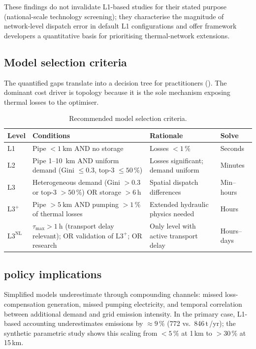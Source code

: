 \documentclass[a4paper,fleqn]{cas-dc}
\newcommand{\Lplus}{\mathrm{L3}^{+}}
\newcommand{\Lnl}{\mathrm{L3}^{\mathrm{NL}}}
\begin{document}
These findings do not invalidate L1-based studies for their
stated purpose (national-scale technology screening); they
characterise the magnitude of network-level dispatch error in
default L1 configurations and offer framework developers a
quantitative basis for prioritising thermal-network extensions.

\subsection{Model selection criteria}
\label{sec:disc_criteria}

The quantified gaps translate into a decision tree for
practitioners (). The dominant cost driver is
topology because it is the sole mechanism exposing thermal losses
to the optimiser.

\begin{table}[!ht]
\centering
\caption{Recommended model selection criteria.}
\label{tab:criteria}
\footnotesize
\begin{tabular}{@{} l p{5.5cm} p{3.2cm} l @{}}
\toprule
Level & Conditions & Rationale & Solve \\
\midrule
L1
  & Pipe ${<}\SI{1}{\kilo\metre}$ AND no storage
  & Losses ${<}1\,\%$
  & Seconds \\[4pt]
L2
  & Pipe 1--\SI{10}{\kilo\metre} AND uniform demand
    (Gini ${\leq}0.3$, top-3 ${\leq}50\,\%$)
  & Losses significant; demand uniform
  & Minutes \\[4pt]
L3
  & Heterogeneous demand
    (Gini ${>}0.3$ or top-3 ${>}50\,\%$) OR
    storage ${>}6$\,h
  & Spatial dispatch differences
  & Min--hours \\[4pt]
$\Lplus$
  & Pipe ${>}\SI{5}{\kilo\metre}$ AND pumping ${>}1\,\%$
    of thermal losses
  & Extended hydraulic physics needed
  & Hours \\[4pt]
$\Lnl$
  & $\tau_{\max} > \SI{1}{\hour}$ (transport delay relevant);
    OR validation of $\Lplus$;
    OR research
  & Only level with active transport delay
  & Hours--days \\
\bottomrule
\end{tabular}
\end{table}

\subsection{ policy implications}
\label{sec:disc_co2}

Simplified models underestimate  through compounding
channels: missed loss-compensation generation, missed pumping
electricity, and temporal correlation between additional demand
and grid emission intensity. In the primary case, L1-based
accounting underestimates emissions by ${\approx}9\,\%$ (772
vs.\ 846\,t\,/yr); the synthetic parametric study shows this scaling
from ${<}5\,\%$ at 1\,km to ${>}30\,\%$ at 15\,km.
\end{document}
